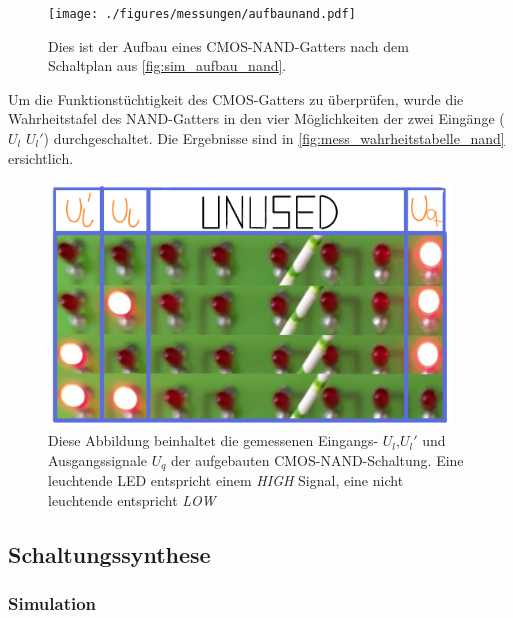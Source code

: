 \documentclass[12pt,english,ngerman]{scrartcl}
\begin{document}
\begin{figure}[H]
  \centering
    \texttt{[image: ./figures/messungen/aufbaunand.pdf]}
  \caption{Dies ist der Aufbau eines CMOS-NAND-Gatters nach dem Schaltplan aus
  \autoref{fig:sim_aufbau_nand}.}
  \label{fig:mess_aufbau_nand}
\end{figure}

Um die Funktionstüchtigkeit des CMOS-Gatters zu überprüfen, wurde die
Wahrheitstafel des NAND-Gatters in den vier Möglichkeiten der zwei Eingänge ($U_l$ $U_l'$) durchgeschaltet.
Die Ergebnisse sind in \autoref{fig:mess_wahrheitstabelle_nand}
ersichtlich.


\begin{figure}[H]
  \centering
    \includegraphics[width=0.95\textwidth]{./figures/messungen/WahrheitstabelleNAND.pdf}
  \caption{Diese Abbildung beinhaltet die gemessenen Eingangs- $U_l$,$U_l'$ und
  Ausgangssignale $U_q$ der aufgebauten CMOS-NAND-Schaltung. Eine leuchtende
  LED entspricht einem \textit{HIGH} Signal, eine nicht leuchtende entspricht
  \textit{LOW}}
  \label{fig:mess_wahrheitstabelle_nand}
\end{figure}


\subsection{Schaltungssynthese}
\subsubsection{Simulation}
\end{document}

